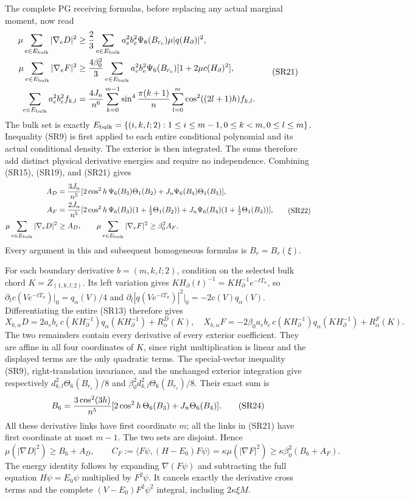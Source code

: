 \documentclass[11pt]{article}
\begin{document}
The complete PG receiving formulas, before replacing any actual marginal moment, now read
\[
\begin{aligned}
\mu\sum_{e\in E_{\rm bulk}}|\nabla_eD|^2
&\ge {2\over3}\sum_{e\in E_{\rm bulk}}a_e^2b_e^2\Psi_6(B_{r_e})\mu|q(H_\partial)|^2,\\
\mu\sum_{e\in E_{\rm bulk}}|\nabla_eF|^2
&\ge {4\beta_0^2\over3}\sum_{e\in E_{\rm bulk}}a_e^2b_e^2\Psi_6(B_{r_e})[1+2\mu c(H_\partial)^2],\\
\sum_{e\in E_{\rm bulk}}a_e^2b_e^2 f_{k,l}
&={4J_n\over n^6}\sum_{k=0}^{m-1}\sin^4{\pi(k+1)\over n}
\sum_{l=0}^{m}\cos^2((2l+1)h)f_{k,l}.
\end{aligned}\tag{SR21}
\]
The bulk set is exactly \(E_{\rm bulk}=\{(i,k,l;2):1\le i\le m-1,0\le k<m,0\le l\le m\}\). Inequality (SR9) is first applied to each entire conditional polynomial and its actual conditional density. The exterior is then integrated. The sums therefore add distinct physical derivative energies and require no independence. Combining (SR15), (SR19), and (SR21) gives
\[
\begin{aligned}
A_D&={3J_n\over n^5}[2\cos^2h\,\Psi_6(B_3)\Theta_1(B_2)
 +J_n\Psi_6(B_4)\Theta_1(B_3)],\\
A_F&={2J_n\over n^5}[2\cos^2h\,\Psi_6(B_3)(1+\tfrac12\Theta_1(B_2))
 +J_n\Psi_6(B_4)(1+\tfrac12\Theta_1(B_3))],\\
\mu\sum_{e\in E_{\rm bulk}}|\nabla_eD|^2&\ge A_D,\qquad
\mu\sum_{e\in E_{\rm bulk}}|\nabla_eF|^2\ge\beta_0^2A_F.
\end{aligned}\tag{SR22}
\]
Every argument in this and subsequent homogeneous formulas is \(B_r=B_r(\xi)\).

For each boundary derivative \(b=(m,k,l;2)\), condition on the selected bulk chord \(K=Z_{(1,k,l;2)}\). Its left variation gives \(KH_\partial(t)^{-1}=KH_\partial^{-1}e^{-tT_\alpha}\), so
\(\partial_t c(Ve^{-tT_\alpha})|_0=q_\alpha(V)/4\) and
\(\partial_t|q(Ve^{-tT_\alpha})|^2|_0=-2c(V)q_\alpha(V)\).
Differentiating the entire (SR13) therefore gives
\[
X_{b,\alpha}D=2a_eb_e\,c(KH_\partial^{-1})q_\alpha(KH_\partial^{-1})+R^D_\alpha(K),\quad
X_{b,\alpha}F=-2\beta_0a_eb_e\,c(KH_\partial^{-1})q_\alpha(KH_\partial^{-1})+R^F_\alpha(K).
\tag{SR23}
\]
The two remainders contain every derivative of every exterior coefficient. They are affine in all four coordinates of \(K\), since right multiplication is linear and the displayed terms are the only quadratic terms. The special-vector inequality (SR9), right-translation invariance, and the unchanged exterior integration give respectively \(d_{k,l}^2\Theta_6(B_{r_e})/8\) and \(\beta_0^2d_{k,l}^2\Theta_6(B_{r_e})/8\). Their exact sum is
\[
B_6={3\cos^2(3h)\over n^5}
[2\cos^2h\,\Theta_6(B_3)+J_n\Theta_6(B_4)].
\tag{SR24}
\]
All these derivative links have first coordinate \(m\); all the links in (SR21) have first coordinate at most \(m-1\). The two sets are disjoint. Hence
\[
\boxed{\mu(|\nabla D|^2)\ge B_6+A_D,\qquad
C_F:=\langle F\psi,(H-E_0)F\psi\rangle
=\kappa\mu(|\nabla F|^2)\ge\kappa\beta_0^2(B_6+A_F).}
\tag{SR25}
\]
The energy identity follows by expanding \(\nabla(F\psi)\) and subtracting the full equation \(H\psi=E_0\psi\) multiplied by \(F^2\psi\). It cancels exactly the derivative cross terms and the complete \((V-E_0)F^2\psi^2\) integral, including \(2\kappa\xi M\).
\end{document}
